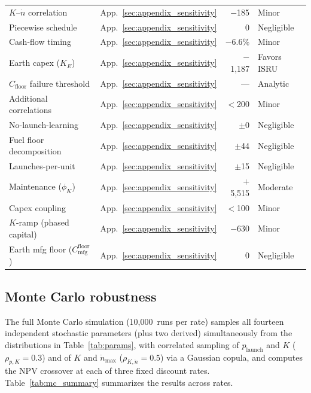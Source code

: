 \documentclass[preprint,12pt]{elsarticle}
\begin{document}
\begin{table}[htbp]
\begin{tabular}{@{}llrl@{}}
$K$--$\dot{n}$ correlation & App.~\ref{sec:appendix_sensitivity} & $-$185 & Minor \\
Piecewise schedule & App.~\ref{sec:appendix_sensitivity} & 0 & Negligible \\
Cash-flow timing & App.~\ref{sec:appendix_sensitivity} & $-$6.6\% & Minor \\
Earth capex ($K_E$) & App.~\ref{sec:appendix_sensitivity} & $-$1{,}187 & Favors ISRU \\
$C_{\mathrm{floor}}$ failure threshold & App.~\ref{sec:appendix_sensitivity} & --- & Analytic \\
Additional correlations & App.~\ref{sec:appendix_sensitivity} & $<$200 & Minor \\
No-launch-learning & App.~\ref{sec:appendix_sensitivity} & $\pm$0 & Negligible \\
Fuel floor decomposition & App.~\ref{sec:appendix_sensitivity} & $\pm$44 & Negligible \\
Launches-per-unit & App.~\ref{sec:appendix_sensitivity} & $\pm$15 & Negligible \\
Maintenance ($\phi_K$) & App.~\ref{sec:appendix_sensitivity} & $+$5{,}515 & Moderate \\
Capex coupling & App.~\ref{sec:appendix_sensitivity} & $<$100 & Minor \\
$K$-ramp (phased capital) & App.~\ref{sec:appendix_sensitivity} & $-$630 & Minor \\
Earth mfg floor ($C_{\mathrm{mfg}}^{\mathrm{floor}}$) & App.~\ref{sec:appendix_sensitivity} & 0 & Negligible \\
\bottomrule
\end{tabular}
\end{table}

\subsection{Monte Carlo robustness}
\label{sec:mc_robustness}

The full Monte Carlo simulation (10{,}000~runs per rate) samples all fourteen independent stochastic parameters (plus two derived) simultaneously from the distributions in Table~\ref{tab:params}, with correlated sampling of $p_{\mathrm{launch}}$ and $K$ ($\rho_{p,K} = 0.3$) and of $K$ and $\dot{n}_{\max}$ ($\rho_{K,\dot{n}} = 0.5$) via a Gaussian copula, and computes the NPV crossover at each of three fixed discount rates. Table~\ref{tab:mc_summary} summarizes the results across rates.
\end{document}
